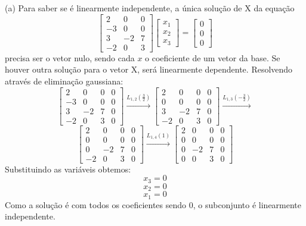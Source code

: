 \documentclass{homework}
\begin{document}
\exercise*
(a) Para saber se é linearmente independente, a única solução de X da equação
\[\begin{bmatrix}
2 & 0 & 0\\
-3 & 0 & 0\\
3 & -2 & 7\\
-2 & 0 & 3
\end{bmatrix}
\begin{bmatrix}
x_1\\
x_2\\
x_3
\end{bmatrix}
=
\begin{bmatrix}
0\\
0\\
0
\end{bmatrix}\]
precisa ser o vetor nulo, sendo cada $x$ o coeficiente de um vetor da base. Se houver outra solução para o vetor X, será linearmente dependente. Resolvendo através de eliminação gaussiana:
\[
\left[ \begin{array}{ccc|c}
2 & 0 & 0 & 0\\
-3 & 0 & 0 & 0\\
3 & -2 & 7 & 0\\
-2 & 0 & 3 & 0
\end{array} \right] \xrightarrow{L_{1,2}(\frac{3}{2})}
\left[ \begin{array}{ccc|c}
2 & 0 & 0 & 0\\
0 & 0 & 0 & 0\\
3 & -2 & 7 & 0\\
-2 & 0 & 3 & 0
\end{array} \right] \xrightarrow{L_{1,3}(-\frac{3}{2})}
\]
\[
\left[ \begin{array}{ccc|c}
2 & 0 & 0 & 0\\
0 & 0 & 0 & 0\\
0 & -2 & 7 & 0\\
-2 & 0 & 3 & 0
\end{array} \right] \xrightarrow{L_{1,4}(1)}
\left[ \begin{array}{ccc|c}
2 & 0 & 0 & 0\\
0 & 0 & 0 & 0\\
0 & -2 & 7 & 0\\
0 & 0 & 3 & 0
\end{array} \right]
\]
Substituindo as variáveis obtemos:
\[x_3 = 0\]
\[x_2 = 0\]
\[x_1 = 0\]
Como a solução é com todos os coeficientes sendo 0, o subconjunto é linearmente independente.
\end{document}

